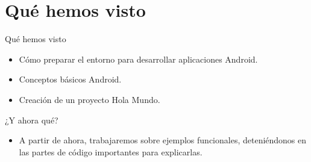 \section*{Qué hemos visto}

\begin{frame}{Qué hemos visto}
  \begin{itemize}
  \item
    Cómo preparar el entorno para desarrollar aplicaciones Android.
  \item
    Conceptos básicos Android.
  \item
    Creación de un proyecto Hola Mundo.
  \end{itemize}
\end{frame}

\begin{frame}{¿Y ahora qué?}
  \begin{itemize}
  \item
    A partir de ahora, trabajaremos sobre ejemplos funcionales, deteniéndonos en las partes de código importantes para explicarlas.
  \end{itemize}
\end{frame}
